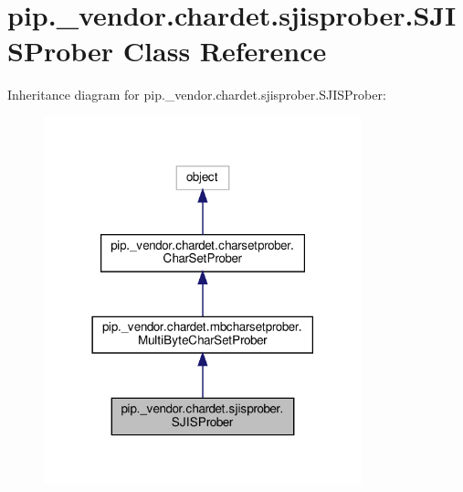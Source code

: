 \hypertarget{classpip_1_1__vendor_1_1chardet_1_1sjisprober_1_1SJISProber}{}\section{pip.\+\_\+vendor.\+chardet.\+sjisprober.\+S\+J\+I\+S\+Prober Class Reference}
\label{classpip_1_1__vendor_1_1chardet_1_1sjisprober_1_1SJISProber}


Inheritance diagram for pip.\+\_\+vendor.\+chardet.\+sjisprober.\+S\+J\+I\+S\+Prober\+:
\nopagebreak
\begin{figure}[H]
\begin{center}
\leavevmode
\includegraphics[width=261pt]{classpip_1_1__vendor_1_1chardet_1_1sjisprober_1_1SJISProber__inherit__graph}
\end{center}
\end{figure}


